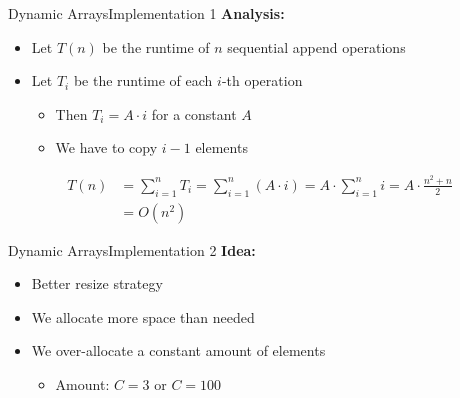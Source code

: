 
\begin{frame}{Dynamic Arrays}{Implementation 1}
  \textbf{Analysis:}
  \begin{itemize}
    \item
      Let $T(n)$ be the runtime of $n$ sequential append operations
    \item
      Let $T_i$ be the runtime of each $i$-th operation
      \begin{itemize}
        \item
          Then $T_i = A \cdot i $ for a constant $A$
        \item
           We have to copy $i-1$ elements
      \end{itemize}
  \end{itemize}
  \begin{align*}
    T(n) &= \sum_{i=1}^n T_i
      = \sum_{i=1}^n \left(A \cdot i \right)
      = A \cdot \sum_{i=1}^n i = A \cdot \frac{n^2 + n}{2}\\
      &= O(n^2)
  \end{align*}
\end{frame}


\begin{frame}{Dynamic Arrays}{Implementation 2}
  \textbf{Idea:}
  \begin{itemize}
    \item
      Better resize strategy
    \item
      We allocate more space than needed
    \item
      We over-allocate a constant amount of elements
      \begin{itemize}
        \item
          Amount: $C = 3$ or $C = 100$
      \end{itemize}
  \end{itemize}
\end{frame}



